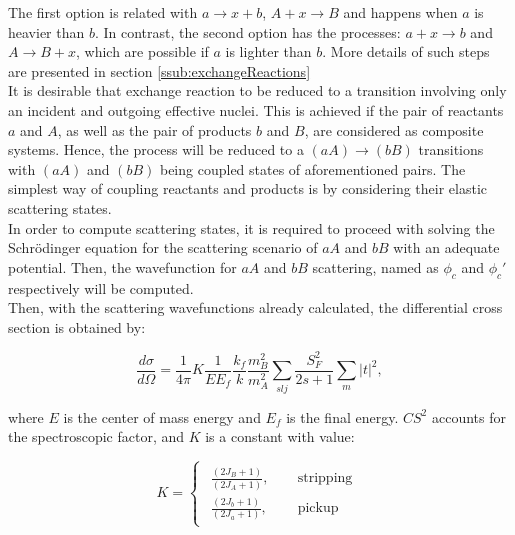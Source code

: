 \documentclass[openany]{book}
\begin{document}
The first option is related with $ a \rightarrow x + b$,  $A + x \rightarrow B$ and happens when $a$ is heavier than $b$. In contrast, the second option has the processes: $a + x \rightarrow b$ and $A \rightarrow B + x$, which are possible if $a$ is lighter than $b$. More details of such steps are presented in section \ref{ssub:exchangeReactions} \\

It is desirable that exchange reaction to be reduced to a transition involving only an incident and outgoing effective nuclei. This is achieved if the pair of reactants $a$ and $A$, as well as the pair of products $b$ and $B$, are considered as composite systems. Hence, the process will be reduced to a $(aA) \rightarrow (bB)$ transitions with $(aA)$ and $(bB)$ being coupled states of aforementioned pairs. The simplest way of coupling reactants and products is by considering their elastic scattering states. \\

In order to compute scattering states, it is required to proceed with solving the Schrödinger equation for the scattering scenario of $aA$ and $bB$ with an adequate potential. Then, the wavefunction for $aA$ and $bB$ scattering, named as  $\phi_c$ and $\phi_c'$ respectively will be computed. \\

Then, with the scattering wavefunctions already calculated, the differential cross section is obtained by:

\begin{equation} \label{eq:exchange_differential}
	\frac{d\sigma}{d\Omega} = \frac{1}{4\pi} K \frac{1}{E E_f} \frac{k_f}{k}\frac{m^2_B}{m^2_A} \sum_{slj} { \frac{S^2_F}{2s + 1}\sum_{m} |t|^2},
\end{equation}

where $E$ is the center of mass energy and $E_f$ is the final energy.  $CS^2$ accounts for the spectroscopic factor, and $K$ is a constant with value:

\begin{equation} \label{eq:exchange_constant}
	K = 	\left\{\begin{array}{l}
		\begin{split}
			\frac{(2J_B + 1)}{(2J_A + 1)}, \quad &\mathrm{\ stripping} \\ 
			\frac{(2J_b + 1)}{(2J_a + 1)}, \quad &\mathrm{\ pickup}
		\end{split}
	\end{array}\right.
\end{equation}
\end{document}
